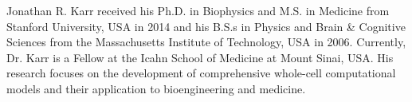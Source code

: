 \documentclass[journal,transmag,twoside]{IEEEtran}
\begin{document}
\begin{IEEEbiography}{Jonathan R. Karr}
received his Ph.D. in Biophysics and M.S. in Medicine from Stanford University, USA in 2014 and his B.S.s in Physics and Brain \& Cognitive Sciences from the Massachusetts Institute of Technology, USA in 2006. Currently, Dr. Karr is a Fellow at the Icahn School of Medicine at Mount Sinai, USA. His research focuses on the development of comprehensive whole-cell computational models and their application to bioengineering and medicine.
\end{IEEEbiography}

\vfill
\end{document}
